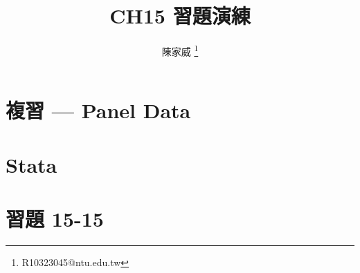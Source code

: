 \documentclass[mathserif]{beamer}
\title{CH15 習題演練}
\author{陳家威 \thanks{R10323045@ntu.edu.tw}}
\begin{document}
    \begin{frame}
        \maketitle
    \end{frame}

    \section{複習 --- Panel Data}
    

    \section{Stata}
    

    \section{習題 15-15}
    
\end{document}
